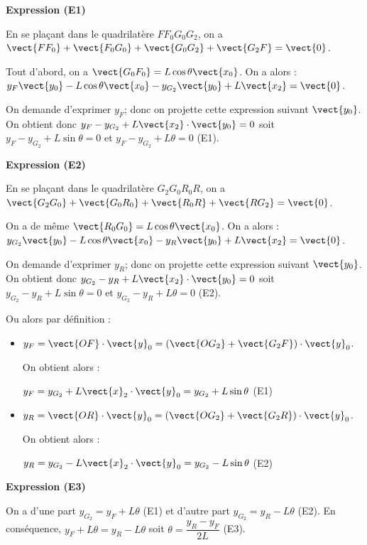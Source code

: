 \documentclass[11pt]{article}
\begin{document}
\begin{UPSTIcorrige}

\textbf{Expression (E1)}

En se plaçant dans le quadrilatère $F F_0 G_0 G_2$, on a $\vect{F F_0} + \vect{F_0 G_0}+\vect{G_0 G_2}+\vect{G_2 F}=\vect{0}$. 

Tout d'abord, on a $\vect{G_0 F_0} = L\cos \theta \vect{x_0}$. On a alors : $y_F \vect{y_0} - L\cos \theta \vect{x_0} - y_{G_2} \vect{y_0} + L\vect{x_2}=\vect{0}$.  

On demande d'exprimer $y_F$; donc on projette cette expression suivant  $\vect{y_0}$. On obtient donc 
$y_F - y_{G_2}  + L\vect{x_2}\cdot \vect{y_0}=0$ soit $y_F - y_{G_2}  + L\sin \theta=0$ et   $y_F - y_{G_2}  + L \theta=0$  (E1).

\textbf{Expression (E2)}

En se plaçant dans le quadrilatère $G_2 G_0 R_0 R$, on a $\vect{G_2 G_0} + \vect{ G_0 R_0}+\vect{R_0 R}+\vect{R G_2 }=\vect{0}$. 

On a de même $\vect{R_0 G_0} = L\cos \theta \vect{x_0}$. On a alors : $y_{G_2} \vect{y_0} - L\cos \theta \vect{x_0} - y_{R} \vect{y_0} + L\vect{x_2}=\vect{0}$.  

On demande d'exprimer $y_R$; donc on projette cette expression suivant  $\vect{y_0}$. On obtient donc 
$y_{G_2}  - y_{R}  + L\vect{x_2}\cdot \vect{y_0}=0$ soit $y_{G_2}  - y_{R}  + L\sin \theta=0$ et $y_{G_2}  - y_{R}  + L \theta=0$ (E2).

Ou alors par définition :

\begin{itemize}
\item $y_F=\vect{OF}\cdot \vect{y}_0=\left(\vect{OG_2}+\vect{G_2F}\right)\cdot \vect{y}_0$.

On obtient alors : 

$y_F=y_{G_2}+L\vect{x}_2\cdot \vect{y}_0=y_{G_2}+L\sin\theta$ (E1)

\item $y_R=\vect{OR}\cdot \vect{y}_0=\left(\vect{OG_2}+\vect{G_2R}\right)\cdot \vect{y}_0$.

On obtient alors : 

$y_R=y_{G_2}-L\vect{x}_2\cdot \vect{y}_0=y_{G_2}-L\sin\theta$ (E2)
\end{itemize} 




\textbf{Expression (E3)}

On a d'une part $y_{G_2} = y_F  + L \theta$  (E1) et d'autre part $y_{G_2}  = y_{R}  - L \theta$ (E2).
En conséquence,  $y_F  + L \theta =  y_{R}  - L \theta$  soit $  \theta = \dfrac{ y_{R} - y_F}{2L } $ (E3).




\end{UPSTIcorrige}
\end{document}
